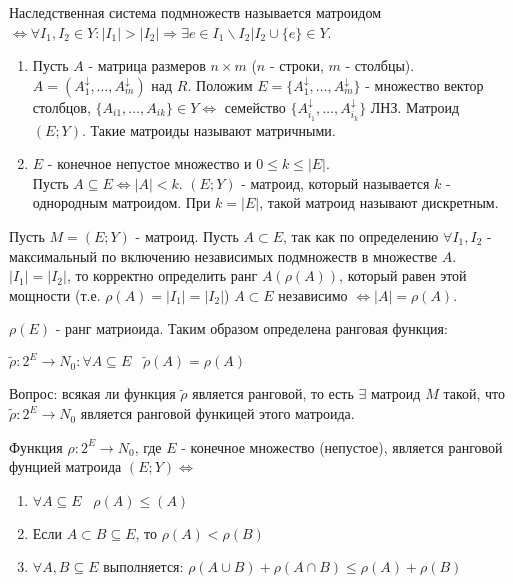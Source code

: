 \oprk Наследственная система подмножеств называется матроидом $\Leftrightarrow \forall I_1,I_2 \in Y : |I_1|>|I_2| \Rightarrow \exists e \in I_1 \backslash I_2 | I_2 \cup \{ e \} \in Y$.\\

\example 
\begin{enumerate}
\item Пусть $A$ - матрица размеров $n \times m$ ($n$ - строки, $m$ - столбцы).
$A = (A^{\downarrow}_1, \ldots , A^{\downarrow}_m)$ над $R$. Положим $ E = \{ A^{\downarrow}_1,\ldots,A^{\downarrow}_m \}$ - множество вектор столбцов, $ \{ A_{i1}, \ldots, A_{ik} \} \in Y \Leftrightarrow$ семейство $ \{ A^{\downarrow}_{i_1}, \ldots, A^{\downarrow}_{i_k} \} $ ЛНЗ.
Матроид $(E;Y)$. Такие матроиды называют матричными. 

\item $E$ - конечное непустое множество и $0 \leqslant k \leqslant |E|$. \\Пусть $A \subseteq E \Leftrightarrow |A| < k $. $ (E;Y) $ - матроид, который называется  $k$ - однородным матроидом. При $k = |E|$, такой матроид называют дискретным. 
\end{enumerate}

\opr Пусть $M = (E;Y)$ - матроид. Пусть $ A \subset E$, так как по определению $\forall I_1,I_2$ - максимальный по включению независимых подмножеств в множестве $A$. $|I_1| = |I_2|$, то корректно определить ранг $A(\rho(A))$, который равен этой мощности (т.е. $\rho(A) = |I_1| = |I_2|$) $A \subset E $ независимо  $\Leftrightarrow |A| = \rho(A).$\par$ \rho(E) $ - ранг матриоида. Таким образом определена ранговая функция:\par
$\tilde{\rho}:2^E \rightarrow N_0 : \forall A \subseteq E \;\;\; \tilde\rho(A) = \rho(A)$

Вопрос: всякая ли функция $\tilde\rho$ является ранговой, то есть $\exists$ матроид $M$ такой, что $\tilde\rho:2^E \rightarrow N_0$ является ранговой функицей этого матроида.

\thr Функция $\rho : 2^E \rightarrow N_0$, где $E$ - конечное множество (непустое), является ранговой фунцией матроида $(E;Y) \Leftrightarrow$
\begin{enumerate}
\item $\forall A \subseteq E \;\;\;  \rho(A) \leqslant (A)$
\item Если $ A \subset B \subseteq E$, то $\rho(A) < \rho(B)$
\item $\forall A,B \subseteq E$ выполняется:
$\rho(A \cup B) + \rho(A \cap B) \leqslant \rho(A) + \rho(B)$
\end{enumerate} 

